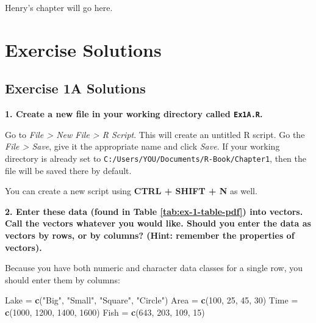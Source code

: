 \documentclass[]{book}
\newenvironment{Shaded}{\begin{snugshade}}{\end{snugshade}}
\newcommand{\KeywordTok}[1]{\textcolor[rgb]{0.13,0.29,0.53}{\textbf{#1}}}
\newcommand{\DecValTok}[1]{\textcolor[rgb]{0.00,0.00,0.81}{#1}}
\newcommand{\StringTok}[1]{\textcolor[rgb]{0.31,0.60,0.02}{#1}}
\newcommand{\NormalTok}[1]{#1}
\theoremstyle{definition}
\theoremstyle{definition}
\theoremstyle{definition}
\theoremstyle{remark}
\begin{document}
Henry's chapter will go here.

\chapter*{Exercise Solutions}\label{exercise-solutions}

\hypertarget{ex1a-answers}{\section*{Exercise 1A
Solutions}\label{ex1a-answers}}

\textbf{1. Create a new file in your working directory called
\texttt{Ex1A.R}.}

Go to \emph{File \textgreater{} New File \textgreater{} R Script}. This
will create an untitled R script. Go the \emph{File \textgreater{}
Save}, give it the appropriate name and click \emph{Save}. If your
working directory is already set to
\texttt{C:/Users/YOU/Documents/R-Book/Chapter1}, then the file will be
saved there by default.

You can create a new script using \textbf{CTRL + SHIFT + N} as well.

\textbf{2. Enter these data (found in Table \ref{tab:ex-1-table-pdf})
into vectors. Call the vectors whatever you would like. Should you enter
the data as vectors by rows, or by columns? (Hint: remember the
properties of vectors).}

Because you have both numeric and character data classes for a single
row, you should enter them by columns:

\begin{Shaded}
\begin{Highlighting}[]
\NormalTok{Lake =}\StringTok{ }\KeywordTok{c}\NormalTok{(}\StringTok{"Big"}\NormalTok{, }\StringTok{"Small"}\NormalTok{, }\StringTok{"Square"}\NormalTok{, }\StringTok{"Circle"}\NormalTok{)}
\NormalTok{Area =}\StringTok{ }\KeywordTok{c}\NormalTok{(}\DecValTok{100}\NormalTok{, }\DecValTok{25}\NormalTok{, }\DecValTok{45}\NormalTok{, }\DecValTok{30}\NormalTok{)}
\NormalTok{Time =}\StringTok{ }\KeywordTok{c}\NormalTok{(}\DecValTok{1000}\NormalTok{, }\DecValTok{1200}\NormalTok{, }\DecValTok{1400}\NormalTok{, }\DecValTok{1600}\NormalTok{)}
\NormalTok{Fish =}\StringTok{ }\KeywordTok{c}\NormalTok{(}\DecValTok{643}\NormalTok{, }\DecValTok{203}\NormalTok{, }\DecValTok{109}\NormalTok{, }\DecValTok{15}\NormalTok{)}
\end{Highlighting}
\end{Shaded}
\end{document}
